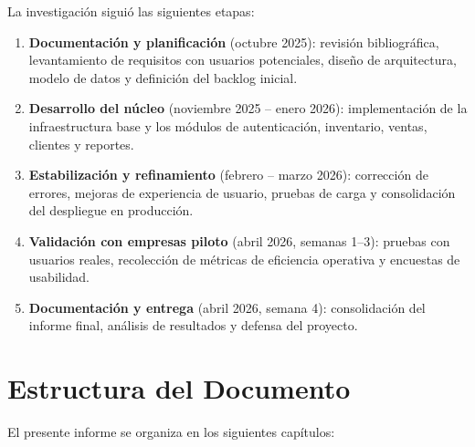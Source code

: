 La investigación siguió las siguientes etapas:

\begin{enumerate}
\def\labelenumi{\arabic{enumi}.}
\tightlist
\item
  \textbf{Documentación y planificación} (octubre 2025): revisión bibliográfica, levantamiento de requisitos con usuarios potenciales, diseño de arquitectura, modelo de datos y definición del backlog inicial.
\item
  \textbf{Desarrollo del núcleo} (noviembre 2025 -- enero 2026): implementación de la infraestructura base y los módulos de autenticación, inventario, ventas, clientes y reportes.
\item
  \textbf{Estabilización y refinamiento} (febrero -- marzo 2026): corrección de errores, mejoras de experiencia de usuario, pruebas de carga y consolidación del despliegue en producción.
\item
  \textbf{Validación con empresas piloto} (abril 2026, semanas 1--3): pruebas con usuarios reales, recolección de métricas de eficiencia operativa y encuestas de usabilidad.
\item
  \textbf{Documentación y entrega} (abril 2026, semana 4): consolidación del informe final, análisis de resultados y defensa del proyecto.
\end{enumerate}

\section{Estructura del Documento}\label{estructura-del-documento}

El presente informe se organiza en los siguientes capítulos:

